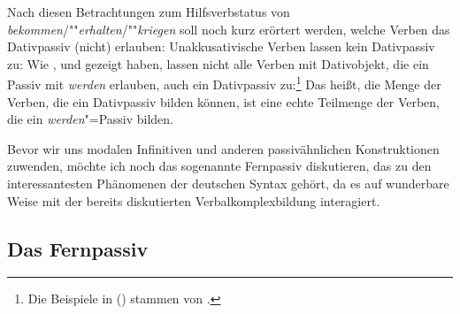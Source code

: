 Nach diesen Betrachtungen zum Hilfsverbstatus von \emph{bekommen}/""\emph{erhalten}/""\emph{kriegen}
soll noch kurz erörtert werden, welche Verben das Dativpassiv (nicht) erlauben:
Unakkusativische Verben lassen kein Dativpassiv zu:
\eal
\label{bsp-kriegen-erg}
\zl
Wie \citet*[]{Reis76a}, \citet*[]{Askedal84} und 
\citet{Leirbukt87} gezeigt haben, lassen nicht alle Verben mit Dativobjekt,
die ein Passiv mit \emph{werden} erlauben, auch ein Dativpassiv zu:\footnote{
        Die Beispiele in () stammen von \citet*[]{Askedal84}.%
}
\eal
{}
\zl
Das heißt, die Menge der Verben, die ein Dativpassiv bilden können,
ist eine echte Teilmenge der Verben, die ein \emph{werden}"=Passiv bilden.

Bevor wir uns modalen Infinitiven und anderen passivähnlichen Konstruktionen
zuwenden, möchte ich noch das sogenannte Fernpassiv diskutieren,
das zu den interessantesten Phänomenen der deutschen Syntax gehört,
da es auf wunderbare Weise mit der bereits diskutierten Verbalkomplexbildung
interagiert.

\subsection{Das Fernpassiv}
\label{sec-remote-passive-phen}

